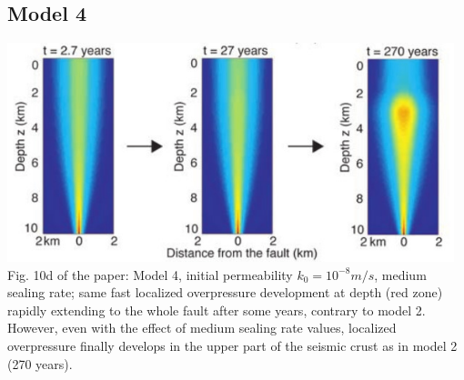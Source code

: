 \subsection*{Model 4}

\begin{center}
\includegraphics[width=13cm]{python_codes/fieldstone_126/images/grfr03_10d}\\
{\captionfont Fig. 10d of the paper:
Model 4, initial permeability $k_0 = 10^{-8} m/s$, 
medium sealing rate; same fast localized overpressure
development at depth (red zone) rapidly extending to the whole fault after some years, 
contrary to model 2. However, even with the effect of medium sealing rate values, 
localized overpressure finally develops in the upper part of the seismic crust as in model 2 (270 years).
}
\end{center}

